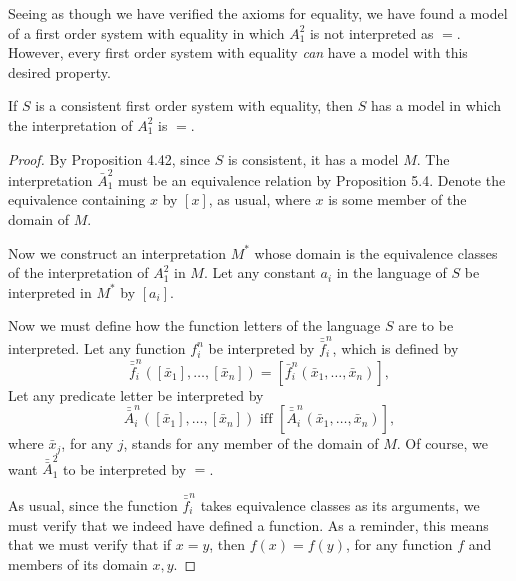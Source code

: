 Seeing as though we have verified the axioms for equality, we have found a model of a first order system with equality in which \(A^2_1\) is not interpreted as \(=\). However, every first order system with equality \textit{can} have a model with this desired property.

\setcounter{definition}{5}
\begin{proposition}
  If \(S\) is a consistent first order system with equality, then \(S\) has a model in which the interpretation of \(A^2_1\) is \(=\).

  \begin{proof}
    By Proposition 4.42, since \(S\) is consistent, it has a model \(M\). The interpretation \(\bar{A}^2_1\) must be an equivalence relation by Proposition 5.4. Denote the equivalence containing \(x\) by \([x]\), as usual, where \(x\) is some member of the domain of \(M\).

    Now we construct an interpretation \(M^*\) whose domain is the equivalence classes of the interpretation of \(A^2_1\) in \(M\). Let any constant \(a_i\) in the language of \(S\) be interpreted in \(M^*\) by \([a_i]\). 

    Now we must define how the function letters of the language \(S\) are to be interpreted. Let any function \(f^n_i\) be interpreted by \(\bar{\bar{f}}^n_i\), which is defined by
    \[\bar{\bar{f}}^n_i([\bar{x}_1], \dots, [\bar{x}_n]) = [\bar{f}^n_i(\bar{x}_1, \dots, \bar{x}_n)],\]
    Let any predicate letter be interpreted by
    \[\bar{\bar{A}}^n_i([\bar{x}_1], \dots, [\bar{x}_n]) \text{ iff } [\bar{\bar{A}}^n_i(\bar{x}_1, \dots, \bar{x}_n)],\]
    where \(\bar{x}_j\), for any \(j\), stands for any member of the domain of \(M\). Of course, we want \(\bar{\bar{A}}^2_1\) to be interpreted by \(=\).

    As usual, since the function \(\bar{\bar{f}}^n_i\) takes equivalence classes as its arguments, we must verify that we indeed have defined a function. As a reminder, this means that we must verify that if \(x = y\), then \(f(x) = f(y)\), for any function \(f\) and members of its domain \(x, y\). 


\end{proof}
\end{proposition}
